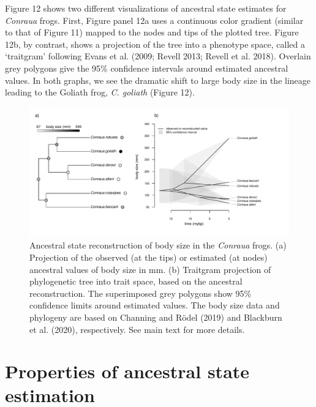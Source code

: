 \documentclass{article}
\begin{document}
Figure 12 shows two different visualizations of ancestral state estimates for \emph{Conraua} frogs. First, Figure panel 12a uses a continuous color gradient (similar to that of Figure 11) mapped to the nodes and tips of the plotted tree. Figure 12b, by contrast, shows a projection of the tree into a phenotype space, called a `traitgram' following Evans et al. (2009; Revell 2013; Revell et al. 2018). Overlain grey polygons give the 95\% confidence intervals around estimated ancestral values. In both graphs, we see the dramatic shift to large body size in the lineage leading to the Goliath frog, \emph{C. goliath} (Figure 12).

\begin{figure}
\includegraphics[width=1\linewidth]{Revell.AncestralReconstruction_files/figure-latex/fig12-1} \caption{Ancestral state reconstruction of body size in the \emph{Conraua} frogs. (a) Projection of the observed (at the tips) or estimated (at nodes) ancestral values of body size in mm. (b) Traitgram projection of phylogenetic tree into trait space, based on the ancestral reconstruction. The superimposed grey polygons show 95\% confidence limits around estimated values. The body size data and phylogeny are based on Channing and Rödel (2019) and Blackburn et al. (2020), respectively. See main text for more details.}\label{fig:fig12}
\end{figure}

\section{Properties of ancestral state estimation}\label{properties-of-ancestral-state-estimation}
\end{document}
